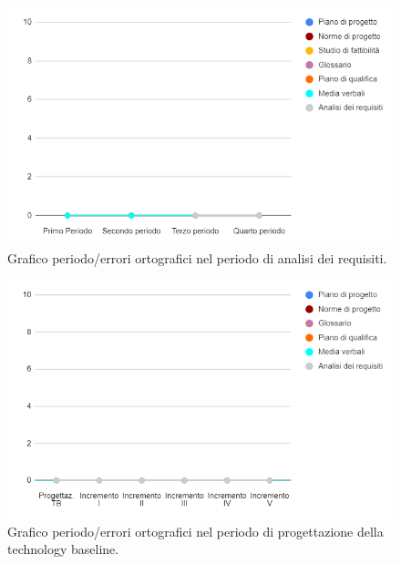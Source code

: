 \begin{figure}[H]
	\centering
	\includegraphics[width=0.8\linewidth]{./res/images/ortografia_1.png}
	\caption{Grafico periodo/errori ortografici nel periodo di analisi dei requisiti.}
	\label{fig:Grafico errori ortografici durante il periodo di analisi dei requisiti.}
\end{figure}

\begin{figure}[H]
	\centering
	\includegraphics[width=0.8\linewidth]{./res/images/ortografia_2.png}
	\caption{Grafico periodo/errori ortografici nel periodo di progettazione della technology baseline.}
	\label{fig:Grafico errori ortografici durante il periodo di progettazione della technology baseline.}
\end{figure}

